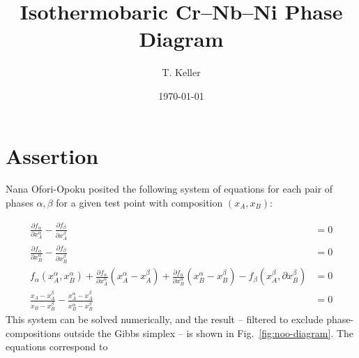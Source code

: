 \documentclass[10pt]{article}
\title{Isothermobaric Cr--Nb--Ni Phase Diagram}
\author{T. Keller}
\date{\small \today}
\begin{document}
\maketitle

\section*{Assertion}

Nana Ofori-Opoku posited the following system of equations for each pair of phases $\alpha, \beta$
for a given test point with composition $(x_A, x_B)$:

\begin{align}
  \label{eqn:noo1}
  \frac{\partial f_{\alpha}}{\partial x_A^{\alpha}} -
  \frac{\partial f_{\beta}}{\partial x_A^{\beta}}
  &= 0\\
  \label{eqn:noo2}
  \frac{\partial f_{\alpha}}{\partial x_B^{\alpha}} -
  \frac{\partial f_{\beta}}{\partial x_B^{\beta}}
  &= 0\\
  \label{eqn:noo3}
  f_{\alpha}(x_A^{\alpha}, x_B^{\alpha}) +
  \frac{\partial f_{\alpha}}{\partial x_A^{\alpha}}\left(x_A^{\alpha} - x_A^{\beta}\right) +
  \frac{\partial f_{\alpha}}{\partial x_B^{\alpha}}\left(x_B^{\alpha} - x_B^{\beta}\right) -
  f_{\beta}(x_A^{\beta}, \partial x_B^{\beta})
  &= 0\\
  \label{eqn:noo4}
  \frac{x_A - x_A^{\beta}}{x_B - x_B^{\beta}} -
  \frac{x_A^{\alpha} - x_A^{\beta}}{x_B^{\alpha} - x_B^{\beta}}
  &= 0
\end{align}
This system can be solved numerically, and the result -- filtered to exclude phase-compositions
outside the Gibbs simplex -- is shown in Fig.~\ref{fig:noo-diagram}. The equations correspond to
\end{document}
